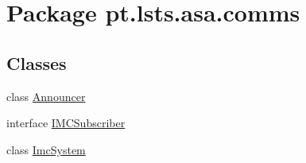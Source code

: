 \hypertarget{namespacept_1_1lsts_1_1asa_1_1comms}{}\section{Package pt.\+lsts.\+asa.\+comms}
\label{namespacept_1_1lsts_1_1asa_1_1comms}
\subsection*{Classes}
\begin{DoxyCompactItemize}
\item 
class \hyperlink{classpt_1_1lsts_1_1asa_1_1comms_1_1Announcer}{Announcer}
\item 
interface \hyperlink{interfacept_1_1lsts_1_1asa_1_1comms_1_1IMCSubscriber}{I\+M\+C\+Subscriber}
\item 
class \hyperlink{classpt_1_1lsts_1_1asa_1_1comms_1_1ImcSystem}{Imc\+System}
\end{DoxyCompactItemize}
